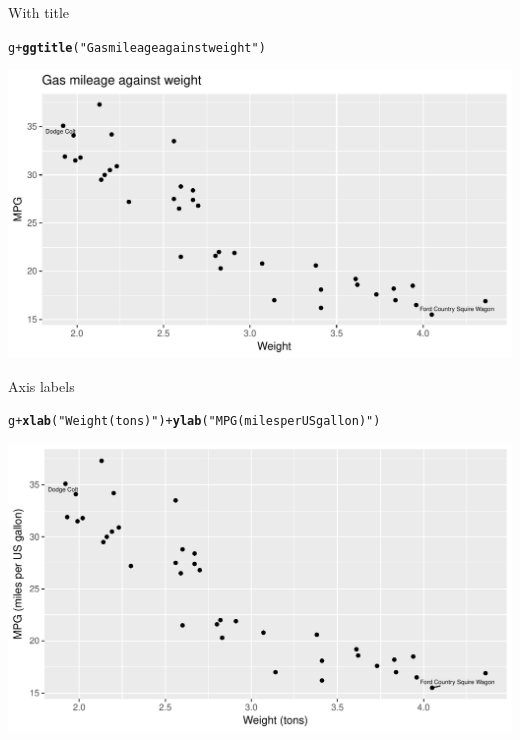 \documentclass[unknownkeysallowed]{beamer}\usepackage[]{graphicx}\usepackage[]{color}
\makeatletter
\def\maxwidth{ %
  \ifdim\Gin@nat@width>\linewidth
    \linewidth
  \else
    \Gin@nat@width
  \fi
}
\newcommand{\hlstr}[1]{\textcolor[rgb]{0.192,0.494,0.8}{#1}}%
\newcommand{\hlopt}[1]{\textcolor[rgb]{0,0,0}{#1}}%
\newcommand{\hlstd}[1]{\textcolor[rgb]{0.345,0.345,0.345}{#1}}%
\newcommand{\hlkwd}[1]{\textcolor[rgb]{0.737,0.353,0.396}{\textbf{#1}}}%
\newenvironment{kframe}{%
 \def\at@end@of@kframe{}%
 \ifinner\ifhmode%
  \def\at@end@of@kframe{\end{minipage}}%
  \begin{minipage}{\columnwidth}%
 \fi\fi%
 \def\FrameCommand##1{\hskip\@totalleftmargin \hskip-\fboxsep
 \colorbox{shadecolor}{##1}\hskip-\fboxsep
     \hskip-\linewidth \hskip-\@totalleftmargin \hskip\columnwidth}%
 \MakeFramed {\advance\hsize-\width
   \@totalleftmargin\z@ \linewidth\hsize
   \@setminipage}}%
 {\par\unskip\endMakeFramed%
 \at@end@of@kframe}
\newenvironment{knitrout}{}{} %
\makeatother
\begin{document}
\begin{frame}[fragile]{With title}
  
\begin{knitrout}
\color{fgcolor}\begin{kframe}
\begin{alltt}
\hlstd{g}\hlopt{+}\hlkwd{ggtitle}\hlstd{(}\hlstr{"Gas mileage against weight"}\hlstd{)}
\end{alltt}
\end{kframe}
\includegraphics[width=\maxwidth]{figure/unnamed-chunk-432-1} 

\end{knitrout}
  
\end{frame}

\begin{frame}[fragile]{Axis labels}
  
\begin{knitrout}
\color{fgcolor}\begin{kframe}
\begin{alltt}
\hlstd{g}\hlopt{+}\hlkwd{xlab}\hlstd{(}\hlstr{"Weight (tons)"}\hlstd{)}\hlopt{+}\hlkwd{ylab}\hlstd{(}\hlstr{"MPG (miles per US gallon)"}\hlstd{)}
\end{alltt}
\end{kframe}
\includegraphics[width=\maxwidth]{figure/unnamed-chunk-433-1} 

\end{knitrout}
  
\end{frame}
\end{document}
